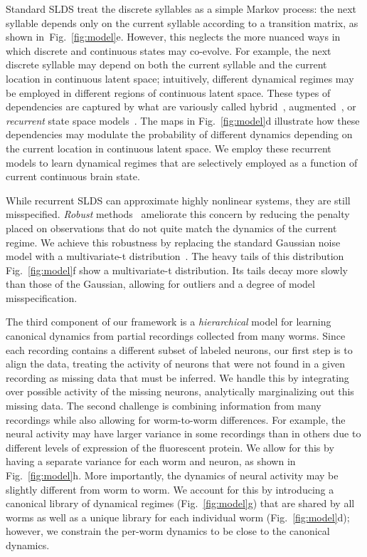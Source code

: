 \documentclass[11pt]{article}
\begin{document}
Standard SLDS treat the discrete syllables as a simple Markov
process: the next syllable depends only on the current syllable according
to a transition matrix, as shown in~Fig.~\ref{fig:model}e. However,
this neglects the more nuanced ways in which discrete and continuous
states may co-evolve. For example, the next discrete syllable may depend
on both the current syllable and the current location in
continuous latent space; intuitively, different dynamical regimes may
be employed in different regions of continuous latent space. These
types of dependencies are captured by what are variously called
hybrid~\citep{paoletti2007identification},
augmented~\citep{barber2006expectation}, or \emph{recurrent} state
space models~\citep{linderman2017recurrent}. The maps in
Fig.~\ref{fig:model}d illustrate how these dependencies may modulate
the probability of different dynamics depending on the current
location in continuous latent space. We employ these recurrent models
to learn dynamical regimes that are selectively employed as a
function of current continuous brain state.

While recurrent SLDS can approximate highly nonlinear systems, they
are still misspecified. \emph{Robust} methods~\citep{huber1981robust}
ameliorate this concern by reducing the penalty placed on observations
that do not quite match the dynamics of the current regime.  We
achieve this robustness by replacing the standard Gaussian noise model
with a multivariate-t distribution~\citep{lange1989robust}.  The heavy
tails of this distribution Fig.~\ref{fig:model}f show a multivariate-t
distribution. Its tails decay more slowly than those of the
Gaussian, allowing for outliers and a degree of model
misspecification.

The third component of our framework is a \emph{hierarchical} model
for learning canonical dynamics from partial recordings collected from
many worms.  Since each recording contains a different subset of
labeled neurons, our first step is to align the data, treating the
activity of neurons that were not found in a given recording as
missing data that must be inferred.  We handle this by integrating
over possible activity of the missing neurons, analytically
marginalizing out this missing data.  The second challenge is
combining information from many recordings while also allowing for
worm-to-worm differences.  For example, the neural activity may have
larger variance in some recordings than in others due to different
levels of expression of the fluorescent protein.  We allow for this by
having a separate variance for each worm and neuron, as shown in
Fig.~\ref{fig:model}h.  More importantly, the dynamics of neural
activity may be slightly different from worm to worm.  We account for
this by introducing a canonical library of dynamical regimes
(Fig.~\ref{fig:model}g) that are shared by all worms as well as a
unique library for each individual worm (Fig.~\ref{fig:model}d);
however, we constrain the per-worm dynamics to be close to the
canonical dynamics.
\end{document}
